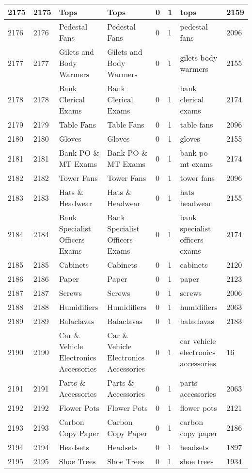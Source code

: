 \begin{longtable}{|l|l|l|l|l|l|l|l|}
2175 & 2175 & Tops & Tops & 0 & 1 & tops & 2159 \\ \hline 
2176 & 2176 & Pedestal Fans & Pedestal Fans & 0 & 1 & pedestal fans & 2096 \\ \hline 
2177 & 2177 & Gilets and Body Warmers & Gilets and Body Warmers & 0 & 1 & gilets body warmers & 2155 \\ \hline 
2178 & 2178 & Bank Clerical Exams & Bank Clerical Exams & 0 & 1 & bank clerical exams & 2174 \\ \hline 
2179 & 2179 & Table Fans & Table Fans & 0 & 1 & table fans & 2096 \\ \hline 
2180 & 2180 & Gloves & Gloves & 0 & 1 & gloves & 2155 \\ \hline 
2181 & 2181 & Bank PO \& MT Exams & Bank PO \& MT Exams & 0 & 1 & bank po mt exams & 2174 \\ \hline 
2182 & 2182 & Tower Fans & Tower Fans & 0 & 1 & tower fans & 2096 \\ \hline 
2183 & 2183 & Hats \& Headwear & Hats \& Headwear & 0 & 1 & hats headwear & 2155 \\ \hline 
2184 & 2184 & Bank Specialist Officers Exams & Bank Specialist Officers Exams & 0 & 1 & bank specialist officers exams & 2174 \\ \hline 
2185 & 2185 & Cabinets & Cabinets & 0 & 1 & cabinets & 2120 \\ \hline 
2186 & 2186 & Paper & Paper & 0 & 1 & paper & 2123 \\ \hline 
2187 & 2187 & Screws & Screws & 0 & 1 & screws & 2006 \\ \hline 
2188 & 2188 & Humidifiers & Humidifiers & 0 & 1 & humidifiers & 2063 \\ \hline 
2189 & 2189 & Balaclavas & Balaclavas & 0 & 1 & balaclavas & 2183 \\ \hline 
2190 & 2190 & Car \& Vehicle Electronics Accessories & Car \& Vehicle Electronics Accessories & 0 & 1 & car vehicle electronics accessories & 16 \\ \hline 
2191 & 2191 & Parts \& Accessories & Parts \& Accessories & 0 & 1 & parts accessories & 2063 \\ \hline 
2192 & 2192 & Flower Pots & Flower Pots & 0 & 1 & flower pots & 2121 \\ \hline 
2193 & 2193 & Carbon Copy Paper & Carbon Copy Paper & 0 & 1 & carbon copy paper & 2186 \\ \hline 
2194 & 2194 & Headsets & Headsets & 0 & 1 & headsets & 1897 \\ \hline 
2195 & 2195 & Shoe Trees & Shoe Trees & 0 & 1 & shoe trees & 1934 \\ \hline 

\end{longtable}
